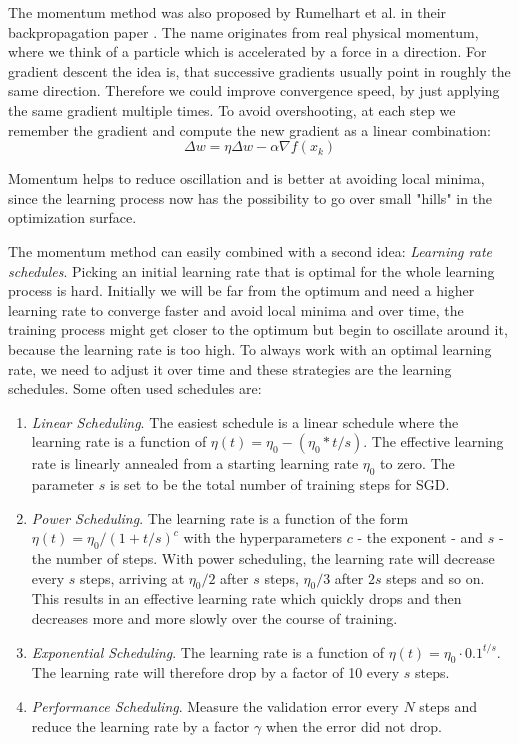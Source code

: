 The momentum method was also proposed by Rumelhart et al. in their backpropagation paper \cite{rumelhart1986learning}. The name originates from real physical momentum, where we think of a particle which is accelerated by a force in a direction. For gradient descent the idea is, that successive gradients usually point in roughly the same direction. Therefore we could improve convergence speed, by just applying the same gradient multiple times. To avoid overshooting, at each step we remember the gradient and compute the new gradient as a linear combination: 
    \[\Delta w = \eta \Delta w - \alpha \nabla f(x_k)\]

Momentum helps to reduce oscillation and is better at avoiding local minima, since the learning process now has the possibility to go over small "hills" in the optimization surface.

The momentum method can easily combined with a second idea: \textit{Learning rate schedules}. Picking an initial learning rate that is optimal for the whole learning process is hard. Initially we will be far from the optimum and need a higher learning rate to converge faster and avoid local minima and over time, the training process might get closer to the optimum but begin to oscillate around it, because the learning rate is too high. To always work with an optimal learning rate, we need to adjust it over time and these strategies are the learning schedules. Some often used schedules are:

\begin{enumerate}
  \item \textit{Linear Scheduling}. The easiest schedule is a linear schedule where the learning rate is a function of $\eta(t) = \eta_0 - (\eta_0 * t/s)$. The effective learning rate is linearly annealed from a starting learning rate $\eta_0$ to zero. The parameter $s$ is set to be the total number of training steps for SGD.
  \item \textit{Power Scheduling}. The learning rate is a function of the form $\eta(t) = \eta_0 / (1 + t/s)^c$ with the hyperparameters $c$ - the exponent - and $s$ - the number of steps. With power scheduling, the learning rate will decrease every $s$ steps, arriving at $\eta_0 / 2$ after $s$ steps, $\eta_0 / 3$ after $2s$ steps and so on. This results in an effective learning rate which quickly drops and then decreases more and more slowly over the course of training.
  \item \textit{Exponential Scheduling}. The learning rate is a function of $\eta(t) = \eta_0 \cdot 0.1^{t/s}$. The learning rate will therefore drop by a factor of 10 every $s$ steps.
  \item \textit{Performance Scheduling}. Measure the validation error every $N$ steps and reduce the learning rate by a factor $\gamma$ when the error did not drop. 
\end{enumerate}

